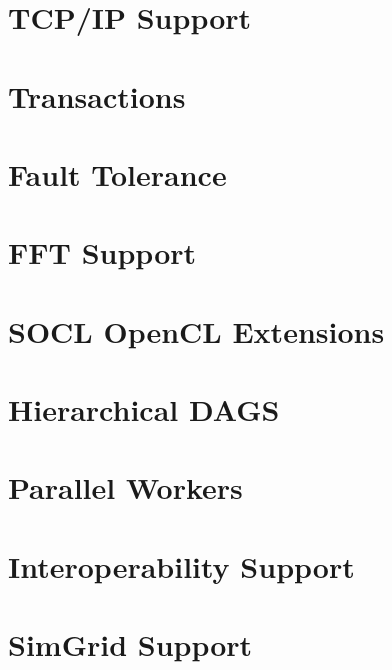 \chapter{TCP/IP Support}
\label{TCPIPSupport}
\hypertarget{TCPIPSupport}{}


\chapter{Transactions}
\label{Transactions}
\hypertarget{Transactions}{}


\chapter{Fault Tolerance}
\label{FaultTolerance}
\hypertarget{FaultTolerance}{}


\chapter{FFT Support}
\label{FFTSupport}
\hypertarget{FFTSupport}{}


\chapter{SOCL OpenCL Extensions}
\label{SOCLOpenclExtensions}
\hypertarget{SOCLOpenclExtensions}{}


\chapter{Hierarchical DAGS}
\label{HierarchicalDAGS}
\hypertarget{HierarchicalDAGS}{}


\chapter{Parallel Workers}
\label{ParallelWorker}
\hypertarget{ParallelWorker}{}


\chapter{Interoperability Support}
\label{InteropSupport}
\hypertarget{InteropSupport}{}


\chapter{SimGrid Support}
\label{SimGridSupport}
\hypertarget{SimGridSupport}{}


